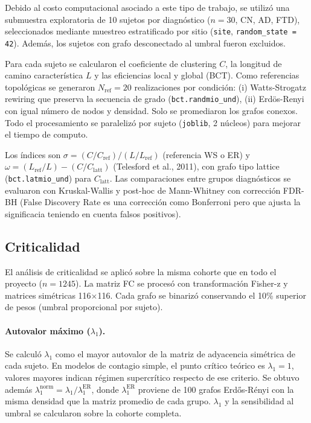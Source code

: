 \documentclass[12pt,a4paper]{article}
\begin{document}
Debido al costo computacional asociado a este tipo de trabajo, se utilizó una submuestra exploratoria de 10 sujetos por diagnóstico ($n = 30$, CN, AD, FTD), seleccionados mediante muestreo estratificado por
sitio (\texttt{site}, \texttt{random\_state = 42}). Además, los sujetos con grafo desconectado al umbral
fueron excluidos.

Para cada sujeto se calcularon el coeficiente de clustering $C$, la longitud de camino característica $L$ y las eficiencias local y global\cite{rubinov2010} (BCT). Como referencias topológicas se generaron $N_{\text{ref}} = 20$ realizaciones por condición: (i) Watts-Strogatz rewiring que preserva la secuencia de grado\cite{watts1998} (\texttt{bct.randmio\_und}), (ii) Erdös-Renyi con igual número de nodos y densidad. Solo se promediaron los grafos conexos. Todo el procesamiento se paralelizó por sujeto (\texttt{joblib}, 2 núcleos) para mejorar el tiempo de computo.

Los índices son $\sigma = (C/C_{\text{ref}})/(L/L_{\text{ref}})$ (referencia WS o ER) y $\omega = (L_{\text{ref}}/L) - (C/C_{\text{latt}})$ (Telesford et al., 2011), con grafo tipo lattice (\texttt{bct.latmio\_und}) para $C_{\text{latt}}$. Las comparaciones entre grupos diagnósticos se evaluaron con Kruskal-Wallis y post-hoc de Mann-Whitney con corrección FDR-BH (False Discovery Rate es una corrección como Bonferroni pero que ajusta la significacia teniendo en cuenta falsos positivos).

\subsection{Criticalidad}

El análisis de criticalidad se aplicó sobre la misma cohorte que en todo el proyecto ($n = 1245$). La matriz FC se procesó con transformación Fisher-z y matrices simétricas 116$\times$116. Cada grafo
se binarizó conservando el 10\% superior de pesos (umbral proporcional por sujeto).

\paragraph{Autovalor máximo ($\lambda_1$).} Se calculó $\lambda_1$ como el mayor autovalor de la
matriz de adyacencia simétrica de cada sujeto\cite{larremore2011}. En modelos de contagio simple, el punto crítico
teórico es $\lambda_1 = 1$, valores mayores indican régimen supercrítico respecto de ese
criterio. Se obtuvo además $\lambda_1^{\text{norm}} = \lambda_1 / \lambda_1^{\text{ER}}$,
donde $\lambda_1^{\text{ER}}$ proviene de 100 grafos Erd\H{o}s-R\'enyi con la misma densidad
que la matriz promedio de cada grupo. $\lambda_1$ y la sensibilidad al umbral se calcularon
sobre la cohorte completa.
\end{document}
